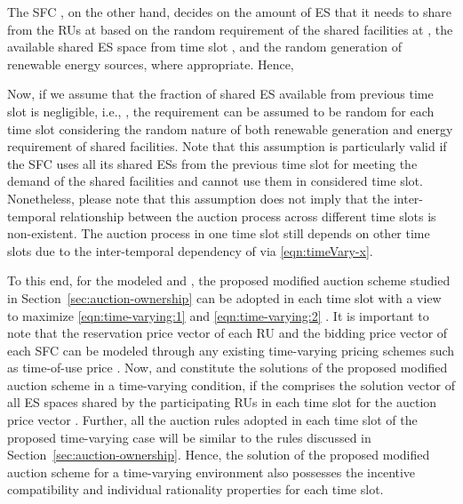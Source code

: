 \documentclass[journal,10pt]{IEEEtran}
\begin{document}
The SFC , on the other hand, decides on the amount of ES  that it needs to share from the RUs at  based on the random requirement of the shared facilities at , the available shared ES space  from time slot ,  and the random generation of renewable energy sources, where appropriate. Hence,

Now, if we assume that the fraction of shared ES available from previous time slot is negligible, i.e., , the requirement  can be assumed to be random for each time slot  considering the random nature of both renewable generation and energy requirement of shared facilities. Note that this assumption is particularly valid if the SFC uses all its shared ESs from the previous time slot for meeting the demand of the shared facilities and cannot use them in considered time slot. Nonetheless, please note that this assumption does not imply that the inter-temporal relationship between the auction process across different time slots is non-existent. The auction process in one time slot still depends on other time slots due to the inter-temporal dependency of  via \eqref{eqn:timeVary-x}.

To this end, for the modeled  and , the proposed modified auction scheme studied in Section~\ref{sec:auction-ownership} can be adopted in each time slot  with a view to maximize \eqref{eqn:time-varying:1} and \eqref{eqn:time-varying:2} . It is important to note that the reservation price vector  of each RU   and the bidding price vector  of each SFC  can be modeled through any existing time-varying pricing schemes such as time-of-use price \cite{Fang-J-CST:2012}. Now,  and  constitute the solutions of the proposed modified auction scheme in a time-varying condition, if the  comprises the solution vector of all ES spaces shared by the participating RUs in each time slot  for the auction price vector . Further, all the auction rules adopted in each time slot of the proposed time-varying case will be similar to the rules discussed in Section~\ref{sec:auction-ownership}. Hence, the solution of the proposed modified auction scheme for a time-varying environment also possesses the incentive compatibility and individual rationality properties for each time slot.
\end{document}
